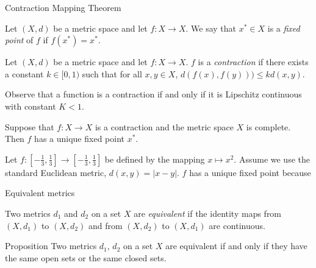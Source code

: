 \documentclass [aspectratio=169]{beamer}
\begin{document}
\begin{frame}{Contraction Mapping Theorem}
\begin{definition}
Let $(X,d)$ be a metric space and let $f:X \to X$. We say that $x^* \in X$ is a \emph{fixed point} of $f$ if $f(x^*) = x^*$.
\end{definition}

\begin{definition}
Let $(X,d)$ be a metric space and let $f:X \to X$. $f$ is a \emph{contraction} if there exists a constant $k \in [0,1)$ such that for all $x,y \in X$, $d(f(x),f(y))) \leq k d(x,y)$.
\end{definition}

Observe that a function is a contraction if and only if it is Lipschitz continuous with constant $K < 1$.



\begin{theorem}
Suppose that $f : X \to X$ is a contraction and the metric space $X$ is complete. Then $f$ has a unique fixed point $x^*$.
\end{theorem}
\end{frame}

\begin{frame}

\begin{example}
Let $f:\left[-\frac{1}{3},\frac{1}{3}\right] \to \left[-\frac{1}{3},\frac{1}{3}\right]$ be defined by the mapping $x \mapsto x^2$. Assume we use the standard Euclidean metric, $d(x,y) = |x-y|$. $f$ has a unique fixed point because

\vspace{5cm}
\end{example}

\end{frame}


\begin{frame}{Equivalent metrics}
\begin{definition}
Two metrics $d_1$ and $d_2$ on a set $X$ are \emph{equivalent} if the identity maps from $(X,d_1)$ to $(X,d_2)$ and from $(X,d_2)$ to $(X,d_1)$ are continuous. 
\end{definition}

\vspace{1em}

\begin{exampleblock}{Proposition}
Two metrics $d_1$, $d_2$ on a set $X$ are equivalent if and only if they have the same open sets or the same closed sets.
\end{exampleblock}
\end{frame}
\end{document}
